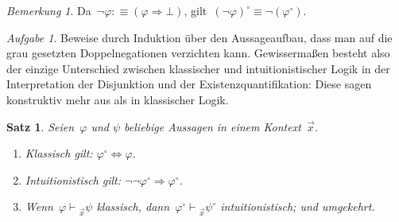 \documentclass[a4paper,ngerman,12pt]{scrartcl}
\theoremstyle{definition}
\theoremstyle{plain}
\newtheorem{satz}[defn]{Satz}
\theoremstyle{remark}
\newtheorem{bem}[defn]{Bemerkung}
\newtheorem{aufg}[defn]{Aufgabe}
\newcommand{\seq}[1]{\mathrel{\vdash\!\!\!_{#1}}}
\renewcommand{\_}{\mathpunct{.}\,}
\newcommand{\?}{\,{:}\,}
\begin{document}
\begin{bem}Da~$\neg\varphi :\equiv (\varphi \Rightarrow \bot)$,
gilt~$(\neg\varphi)^\circ \equiv \neg(\varphi^\circ)$.\end{bem}

\begin{aufg}Beweise durch Induktion über den Aussageaufbau, dass man auf die grau
gesetzten Doppelnegationen verzichten kann. Gewissermaßen besteht also der
einzige Unterschied zwischen klassischer und intuitionistischer Logik in der
Interpretation der Disjunktion und der Existenzquantifikation: Diese sagen
konstruktiv mehr aus als in klassischer Logik.\end{aufg}

\begin{satz}\label{dnt:proof}Seien~$\varphi$ und $\psi$ beliebige Aussagen in einem Kontext~$\vec x$.
\begin{enumerate}
\item Klassisch gilt: $\varphi^\circ \Longleftrightarrow \varphi$.
\item Intuitionistisch gilt: $\neg\neg\varphi^\circ \Longrightarrow
\varphi^\circ$.
\item Wenn~$\varphi \seq{\vec x} \psi$ klassisch, dann~$\varphi^\circ \seq{\vec
x} \psi^\circ$ intuitionistisch; und umgekehrt.
\end{enumerate}
\end{satz}
\end{document}

